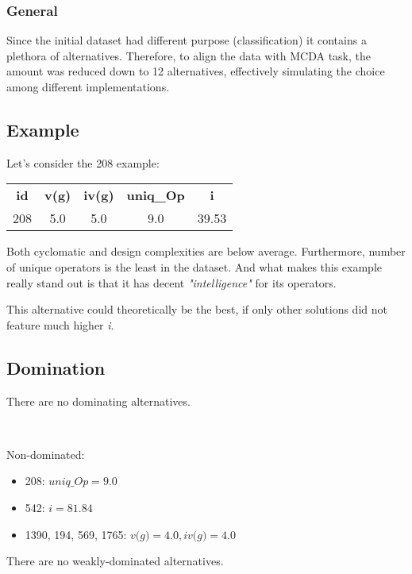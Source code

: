 \documentclass{article}
\begin{document}
\subsubsection{General}
Since the initial dataset had different purpose (classification) it contains a plethora of alternatives. Therefore, to align the data with MCDA task, the amount was reduced down to 12 alternatives, effectively simulating the choice among different implementations.

\subsection{Example}

Let's consider the 208 example:

\begin{center}
\begin{tabular}{ |c|c|c|c|c| }
    \textbf{id} & \textbf{v(g)} & \textbf{iv(g)} & \textbf{uniq\_Op} & \textbf{i} \\
    208 & 5.0 & 5.0 & 9.0 & 39.53 \\
\end{tabular}
\end{center}

Both cyclomatic and design complexities are below average. Furthermore, number of unique operators is the least in the dataset. And what makes this example really stand out is that it has decent \textit{"intelligence"} for its operators.

This alternative could theoretically be the best, if only other solutions did not feature much higher \textit{i}.



\subsection{Domination}
\noindent There are no dominating alternatives.

\

\noindent Non-dominated:

\begin{itemize}
    \item 208: $\textit{uniq\_Op} = 9.0$
    \item 542: $\textit{i} = 81.84$
    \item 1390, 194, 569, 1765: $\textit{v(g)} = 4.0, \textit{iv(g)} = 4.0$
\end{itemize}


\noindent There are no weakly-dominated alternatives.
\end{document}
